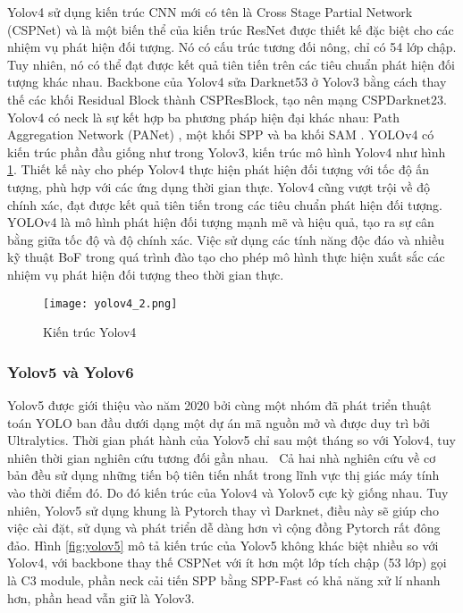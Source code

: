\documentclass[../the.tex]{subfiles}
\begin{document}
{\fontsize{13}{12} \selectfont 
Yolov4 sử dụng kiến trúc CNN mới có tên là Cross Stage Partial Network (CSPNet) \cite{wang2019cspnet} và là một biến thể của kiến trúc ResNet được thiết kế đặc biệt cho các nhiệm vụ phát hiện đối tượng. Nó có cấu trúc tương đối nông, chỉ có 54 lớp chập. Tuy nhiên, nó có thể đạt được kết quả tiên tiến trên các tiêu chuẩn phát hiện đối tượng khác nhau.
Backbone của Yolov4 sửa Darknet53 ở Yolov3 bằng cách thay thế các khối Residual Block thành CSPResBlock, tạo nên mạng CSPDarknet23.
Yolov4 có neck là sự kết hợp ba phương pháp hiện đại khác nhau: Path Aggregation Network (PANet) \cite{liu2018path}, một khối SPP \cite{He_2014} và ba khối SAM \cite{woo2018cbam}.
YOLOv4 có kiến trúc phần đầu giống như trong Yolov3, kiến trúc mô hình Yolov4 như hình \ref{fig:yolov4_2}. 
Thiết kế này cho phép Yolov4 thực hiện phát hiện đối tượng với tốc độ ấn tượng, phù hợp với các ứng dụng thời gian thực. Yolov4 cũng vượt trội về độ chính xác, đạt được kết quả tiên tiến trong các tiêu chuẩn phát hiện đối tượng.
YOLOv4 là mô hình phát hiện đối tượng mạnh mẽ và hiệu quả, tạo ra sự cân bằng giữa tốc độ và độ chính xác. Việc sử dụng các tính năng độc đáo và nhiều kỹ thuật BoF trong quá trình đào tạo cho phép mô hình thực hiện xuất sắc các nhiệm vụ phát hiện đối tượng theo thời gian thực. 
}
{\fontsize{13}{12} \selectfont 
\begin{figure}[H]
	\centering
	\texttt{[image: yolov4\_2.png]}
	\caption{Kiến trúc Yolov4}
	\label{fig:yolov4_2}
\end{figure}
\bigskip

}
\subsubsection{Yolov5 và Yolov6}
{\fontsize{13}{12} \selectfont 
Yolov5 được giới thiệu vào năm 2020 bởi cùng một nhóm đã phát triển thuật toán YOLO ban đầu dưới dạng một dự án mã nguồn mở và được duy trì bởi Ultralytics.
Thời gian phát hành của Yolov5 chỉ sau một tháng so với Yolov4, tuy nhiên thời gian nghiên cứu tương đối gần nhau. \
Cả hai nhà nghiên cứu về cơ bản đều sử dụng những tiến bộ tiên tiến nhất trong lĩnh vực thị giác máy tính vào thời điểm đó. Do đó kiến trúc của Yolov4 và Yolov5 cực kỳ giống nhau.
Tuy nhiên, Yolov5 sử dụng khung là Pytorch thay vì Darknet, điều này sẽ giúp cho việc cài đặt, sử dụng và phát triển dễ dàng hơn vì cộng đồng Pytorch rất đông đảo.
Hình \ref{fig:yolov5} mô tả kiến trúc của Yolov5 không khác biệt nhiều so với Yolov4, với backbone thay thế CSPNet với ít hơn một lớp tích chập (53 lớp) gọi là C3 module, phần neck cải tiến SPP bằng SPP-Fast có khả năng xử lí nhanh hơn,
phần head vẫn giữ là Yolov3. 
}
\end{document}
